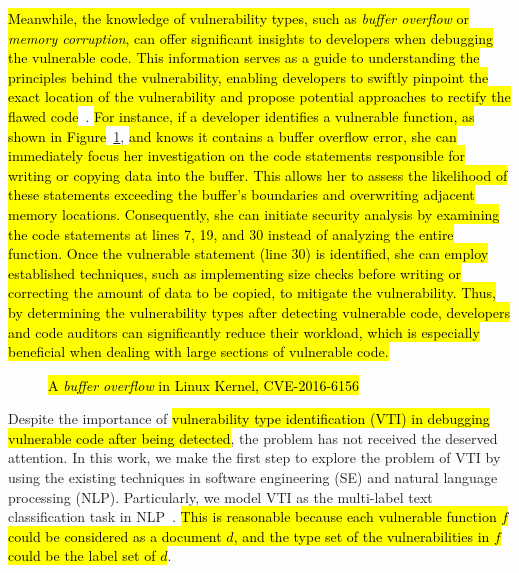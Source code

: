 \hl{Meanwhile, the knowledge of vulnerability types, such as \textit{buffer overflow} or \textit{memory corruption}, can offer significant insights to developers when debugging the vulnerable code. This information serves as a guide to understanding the principles behind the vulnerability, enabling developers to swiftly pinpoint the exact location of the vulnerability and propose potential approaches to rectify the flawed code}~\cite{mu_vuldeeppeker}. 
%
\hl{For instance, if a developer identifies a vulnerable function, as shown in Figure}~\ref{fig:BO_example}, \hl{and knows it contains a buffer overflow error, she can immediately focus her investigation on the code statements responsible for writing or copying data into the buffer. This allows her to assess the likelihood of these statements exceeding the buffer's boundaries and overwriting adjacent memory locations. Consequently, she can initiate security analysis by examining the code statements at lines 7, 19, and 30 instead of analyzing the entire function. Once the vulnerable statement (line 30) is identified, she can employ established techniques, such as implementing size checks before writing or correcting the amount of data to be copied, to mitigate the vulnerability. Thus, by determining the vulnerability types after detecting vulnerable code, developers and code auditors can significantly reduce their workload, which is especially beneficial when dealing with large sections of vulnerable code.}


\begin{figure}
    \centering
    
        \caption{\hl{A \textit{buffer overflow} in Linux Kernel, CVE-2016-6156}}
        \label{fig:BO_example}
\end{figure}


Despite the importance of \hl{vulnerability type identification (VTI) in debugging vulnerable code after being detected}, the problem has not received the deserved attention. In this work, we make the first step to explore the problem of VTI by using the existing techniques in software engineering (SE) and natural language processing (NLP). Particularly, we model VTI as the multi-label text classification task in NLP~\cite{multilabel_cls,text_multi_label,brm}. \hl{This is reasonable because each vulnerable function $f$ could be considered as a document $d$, and the type set of the vulnerabilities in $f$ could be the label set of $d$}. 

